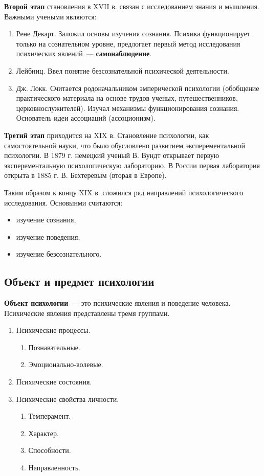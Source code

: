 \textbf{Второй этап} становления в XVII в. связан с исследованием знания и мышления. Важными учеными являются:
\begin{enumerate}
	\item Рене Декарт. Заложил основы изучения сознания. Психика функционирует только на сознательном уровне, предлогает первый метод исследования психических явлений~--- \textbf{самонаблюдение}.
	\item Лейбниц. Ввел понятие безсознательной психической деятельности. 
	\item Дж. Локк. Считается родоначальником эмперической психологии (обобщение практического материала на основе трудов ученых, путешественников, церковнослужителей). Изучал механизмы функционирования сознания. Основатель идеи ассоциаций (ассоционизм).
\end{enumerate}

\textbf{Третий этап} приходится на XIX в. Становление психологии, как самостоятельной науки, что было обусловлено развитием эксперементальной психологии. В 1879 г. немецкий ученый В. Вундт открывает первую эксперементальную психологическую лабораторию. В России первая лаборатория открыта в 1885 г. В. Бехтеревым (вторая в Европе).

Таким образом к концу XIX в. сложился ряд направлений психологического исследования. Основынми считаются:
\begin{itemize}
	\item изучение сознания,
	\item изучение поведения,
	\item изучение безсознательного.
\end{itemize}

\subsection{Объект и предмет психологии}
\textbf{Объект психологии}~--- это психические явления и поведение человека. Психические явления представлены тремя группами.
\begin{enumerate}
	\item Психические процессы.
		\begin{enumerate}
			\item Познавательные.
			\item Эмоционально-волевые.
		\end{enumerate}
	\item Психические состояния.
	\item Психические свойства личности.
		\begin{enumerate}
			\item Темперамент.
			\item Характер.
			\item Способности.
			\item Направленность.
		\end{enumerate}
\end{enumerate}

